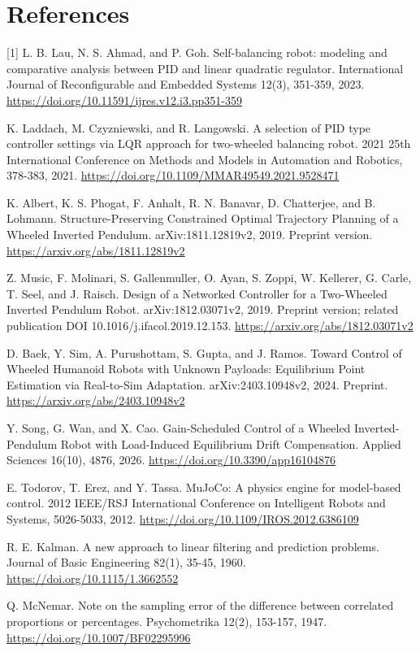 \documentclass[11pt,a4paper]{article}
\begin{document}
\section*{References}
[1] L. B. Lau, N. S. Ahmad, and P. Goh. Self-balancing robot: modeling and comparative analysis between PID and linear quadratic regulator. International Journal of Reconfigurable and Embedded Systems 12(3), 351-359, 2023. \url{https://doi.org/10.11591/ijres.v12.i3.pp351-359}\par
[2] K. Laddach, M. Czyzniewski, and R. Langowski. A selection of PID type controller settings via LQR approach for two-wheeled balancing robot. 2021 25th International Conference on Methods and Models in Automation and Robotics, 378-383, 2021. \url{https://doi.org/10.1109/MMAR49549.2021.9528471}\par
[3] K. Albert, K. S. Phogat, F. Anhalt, R. N. Banavar, D. Chatterjee, and B. Lohmann. Structure-Preserving Constrained Optimal Trajectory Planning of a Wheeled Inverted Pendulum. arXiv:1811.12819v2, 2019. Preprint version. \url{https://arxiv.org/abs/1811.12819v2}\par
[4] Z. Music, F. Molinari, S. Gallenmuller, O. Ayan, S. Zoppi, W. Kellerer, G. Carle, T. Seel, and J. Raisch. Design of a Networked Controller for a Two-Wheeled Inverted Pendulum Robot. arXiv:1812.03071v2, 2019. Preprint version; related publication DOI 10.1016/j.ifacol.2019.12.153. \url{https://arxiv.org/abs/1812.03071v2}\par
[5] D. Baek, Y. Sim, A. Purushottam, S. Gupta, and J. Ramos. Toward Control of Wheeled Humanoid Robots with Unknown Payloads: Equilibrium Point Estimation via Real-to-Sim Adaptation. arXiv:2403.10948v2, 2024. Preprint. \url{https://arxiv.org/abs/2403.10948v2}\par
[6] Y. Song, G. Wan, and X. Cao. Gain-Scheduled Control of a Wheeled Inverted-Pendulum Robot with Load-Induced Equilibrium Drift Compensation. Applied Sciences 16(10), 4876, 2026. \url{https://doi.org/10.3390/app16104876}\par
[7] E. Todorov, T. Erez, and Y. Tassa. MuJoCo: A physics engine for model-based control. 2012 IEEE/RSJ International Conference on Intelligent Robots and Systems, 5026-5033, 2012. \url{https://doi.org/10.1109/IROS.2012.6386109}\par
[8] R. E. Kalman. A new approach to linear filtering and prediction problems. Journal of Basic Engineering 82(1), 35-45, 1960. \url{https://doi.org/10.1115/1.3662552}\par
[9] Q. McNemar. Note on the sampling error of the difference between correlated proportions or percentages. Psychometrika 12(2), 153-157, 1947. \url{https://doi.org/10.1007/BF02295996}\par
\end{document}
